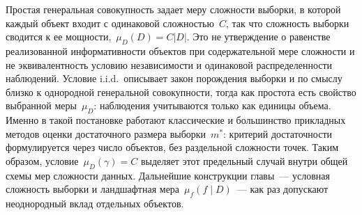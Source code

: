 \begin{remark}\label{chapter:complex:remark-simple-population}
Простая генеральная совокупность задает меру сложности выборки, в которой каждый объект входит с одинаковой сложностью~$C$, так что сложность выборки сводится к ее мощности,~$\mu_D(D)=C|D|$.
Это не утверждение о равенстве реализованной информативности объектов при содержательной мере сложности и не эквивалентность условию независимости и одинаковой распределенности наблюдений.
Условие i.i.d.\ описывает закон порождения выборки и по смыслу близко к однородной генеральной совокупности, тогда как простота есть свойство выбранной меры~$\mu_D$: наблюдения учитываются только как единицы объема.
Именно в такой постановке работают классические и большинство прикладных методов оценки достаточного размера выборки~$m^*$: критерий достаточности формулируется через число объектов, без раздельной сложности точек.
Таким образом, условие~$\mu_D(\gamma)=C$ выделяет этот предельный случай внутри общей схемы мер сложности данных.
Дальнейшие конструкции главы~--- условная сложность выборки и ландшафтная мера~$\mu_f(f\mid D)$~--- как раз допускают неоднородный вклад отдельных объектов.
\end{remark}

